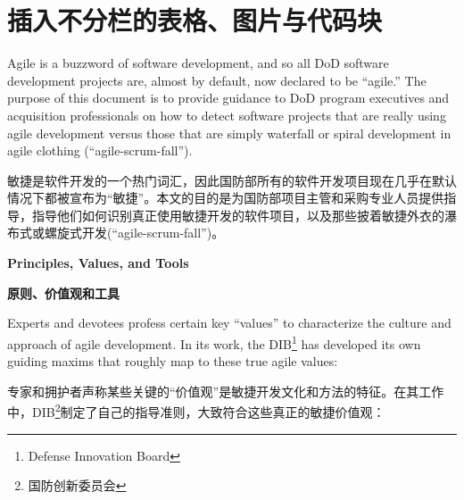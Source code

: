 \documentclass[UTF8, oneside]{ctexbook}
\begin{document}
\section{插入不分栏的表格、图片与代码块}
\begin{paracol}{2}
  \begin{leftcolumn}
    Agile is a buzzword of software development, and so all DoD software development projects are, almost by default, now declared to be “agile.” The purpose of this document is to provide guidance to DoD program executives and acquisition professionals on how to detect software projects that are really using agile development versus those that are simply waterfall or spiral development in agile clothing (“agile-scrum-fall”).
  \end{leftcolumn}
  \begin{rightcolumn}
    敏捷是软件开发的一个热门词汇，因此国防部所有的软件开发项目现在几乎在默认情况下都被宣布为“敏捷”。本文的目的是为国防部项目主管和采购专业人员提供指导，指导他们如何识别真正使用敏捷开发的软件项目，以及那些披着敏捷外衣的瀑布式或螺旋式开发(“agile-scrum-fall”)。
  \end{rightcolumn}
  
  \begin{leftcolumn*}
    \large\textbf{Principles, Values, and Tools}
  \end{leftcolumn*}
  \begin{rightcolumn}
    \large\textbf{原则、价值观和工具}
  \end{rightcolumn}
  
  \begin{leftcolumn*}
    Experts and devotees profess certain key “values” to characterize the culture and approach of agile development. In its work, the DIB\footnote*[1]{Defense Innovation Board} has developed its own guiding maxims that roughly map to these true agile values:
  \end{leftcolumn*}
  \begin{rightcolumn}
    专家和拥护者声称某些关键的“价值观”是敏捷开发文化和方法的特征。在其工作中，DIB\footnote*[1]{国防创新委员会}制定了自己的指导准则，大致符合这些真正的敏捷价值观：
  \end{rightcolumn}
  

\end{paracol}
\end{document}
